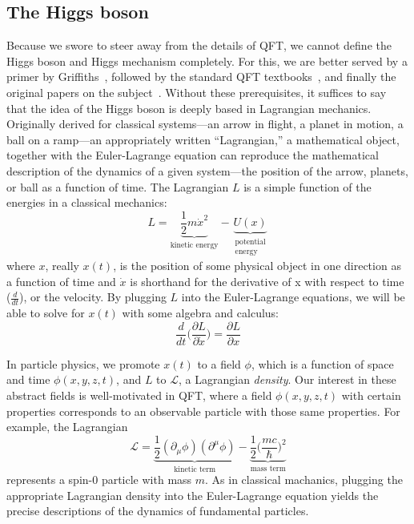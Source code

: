 \subsection{The Higgs boson}
Because we swore to steer away from the details of QFT, we cannot define the Higgs boson and Higgs mechanism completely. 
For this, we are better served by a primer by Griffiths~\cite{GriffithsParticle}, followed by the standard QFT textbooks~\cite{SrednickiQFT, PeskinSchroederQFT}, and finally the original papers on the subject~\cite{EnglertBroutPRL, HiggsPhysLett, HiggsPRL, GuralnikHagenKibblePRL}. 
Without these prerequisites, it suffices to say that the idea of the Higgs boson is deeply based in Lagrangian mechanics. 
Originally derived for classical systems---an arrow in flight, a planet in motion, a ball on a ramp---an appropriately written ``Lagrangian,'' a mathematical object, together with the Euler-Lagrange equation can reproduce the mathematical description of the dynamics of a given system---the position of the arrow, planets, or ball as a function of time. 
The Lagrangian $L$ is a simple function of the energies in a classical mechanics:
\begin{equation}
    L = \underbrace{\frac{1}{2}m\dot{x}^2}_\text{kinetic energy} - \underbrace{U(x)}_{\substack{\text{potential} \\ \text{energy}}}
\end{equation}
where $x$, really $x(t)$, is the position of some physical object in one direction as a function of time and $\dot{x}$ is shorthand for the derivative of x with respect to time ($\frac{d}{dt}$), or the velocity. 
By plugging $L$ into the Euler-Lagrange equations, we will be able to solve for $x(t)$ with some algebra and calculus: 
\begin{equation}
    \frac{d}{dt}\bigg(\frac{\partial L}{\partial\dot{x}}\bigg) = \frac{\partial L}{\partial x}
\end{equation}

In particle physics, we promote $x(t)$ to a field\footnotemark{} $\phi$, which is a function of space and time $\phi(x, y, z, t)$, and $L$ to $\mathcal{L}$, a Lagrangian \textit{density}.
Our interest in these abstract fields is well-motivated in QFT, where a field $\phi(x,y,z,t)$ with certain properties corresponds to an observable particle with those same properties. 
For example, the Lagrangian 
\begin{equation}
    \mathcal{L} = \underbrace{\frac{1}{2}(\partial_\mu\phi)(\partial^\mu\phi)}_{\text{kinetic term}} - \underbrace{\frac{1}{2}\big(\frac{mc}{\hbar}\big)^2}_\text{mass term}
\end{equation}
represents a spin-0 particle with mass $m$. 
As in classical machanics, plugging the appropriate Lagrangian density into the Euler-Lagrange equation yields the precise descriptions of the dynamics of fundamental particles. 

